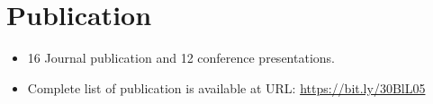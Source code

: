 \documentclass{my_cv}%
\begin{document}
\section{Publication}
\vspace{1em}
%
\begin{itemize}
    \item 16 Journal publication and 12 conference presentations.
    \item Complete list of publication is available at URL: \href{https://bit.ly/30BlL05}{https://bit.ly/30BlL05}
\end{itemize}

\end{document}
